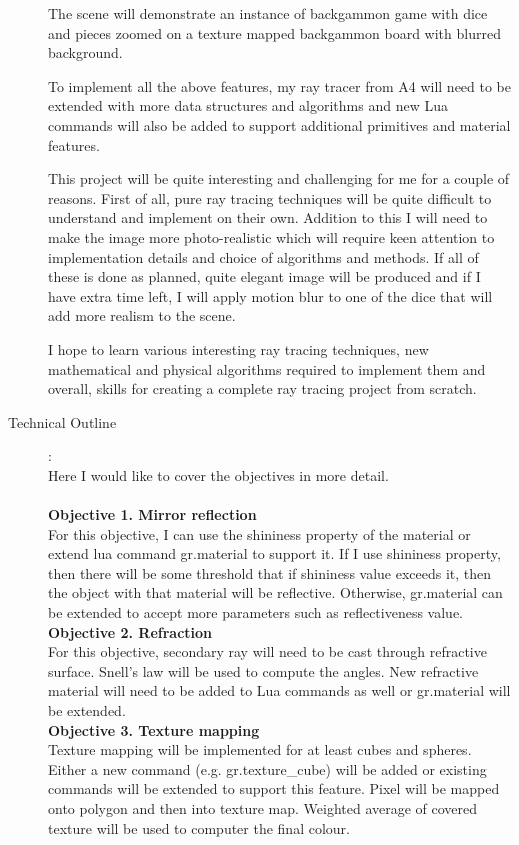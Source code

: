 \documentclass {article}
\begin{document}
\begin{description}
	The scene will demonstrate an instance of backgammon game with dice and pieces zoomed on a
	texture mapped backgammon board with blurred background.

	To implement all the above features, my ray tracer from A4 will need to be extended with more data
	structures and algorithms and new Lua commands will also be added to support additional primitives
	and material features.

	This project will be quite interesting and challenging for me for a couple of reasons. First of all,
	pure ray tracing techniques will be quite difficult to understand and implement on their own. Addition
	to this I will need to make the image more photo-realistic which will require keen attention to implementation
	details and choice of algorithms and methods. If all of these is done as planned, quite elegant image will
	be produced and if I have extra time left, I will apply motion blur to one of the dice that will add more
	realism to the scene.

	I hope to learn various interesting ray tracing techniques, new mathematical and physical algorithms required to
	implement them and overall, skills for creating a complete ray tracing project from scratch.

\newpage

\item[Technical Outline]:\\
	 Here I would like to cover the objectives in more detail.\\
	 \\
	 {\bf Objective 1. Mirror reflection} \\
	 For this objective, I can use the shininess property of the material or extend lua command gr.material
	 to support it. If I use shininess property, then there will be some threshold that if shininess value
	 exceeds it, then the object with that material will be reflective. Otherwise, gr.material can be extended to
	 accept more parameters such as reflectiveness value.\\

	 {\bf Objective 2. Refraction}\\
	 For this objective, secondary ray will need to be cast through refractive surface. Snell's law will be used to compute the angles.
	 New refractive material will need to be added to Lua commands as well or gr.material will be extended.\\

	 {\bf Objective 3. Texture mapping}\\
	 Texture mapping will be implemented for at least cubes and spheres. Either a new command (e.g. gr.texture\_cube) will be added
	 or existing commands will be extended to support this feature. Pixel will be mapped onto polygon and then into texture map. Weighted
	 average of covered texture will be used to computer the final colour.\\


\end{description}
\end{document}

